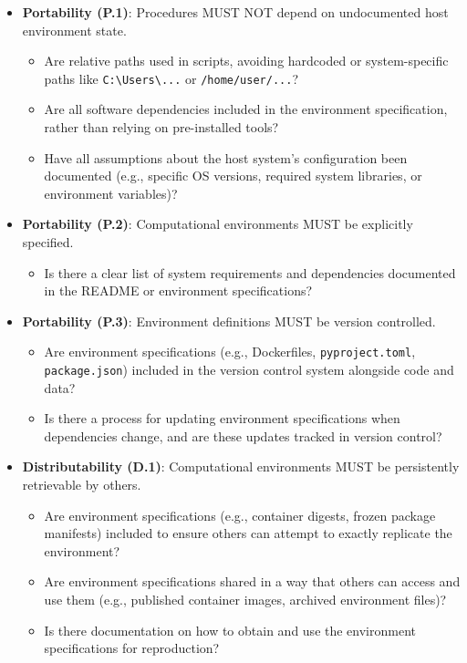 \documentclass{article}
\begin{document}
\begin{itemize}[label=$\triangleright$]
    \item \textbf{Portability (P.1)}: Procedures MUST NOT depend on undocumented host environment state.
    \begin{itemize}[label=$\square$]
        \item Are relative paths used in scripts, avoiding hardcoded or system-specific paths like \texttt{C:\textbackslash Users\textbackslash ...} or \texttt{/home/user/...}?
        \item Are all software dependencies included in the environment specification, rather than relying on pre-installed tools?
        \item Have all assumptions about the host system's configuration been documented (e.g., specific OS versions, required system libraries, or environment variables)?
    \end{itemize}
    \item \textbf{Portability (P.2)}: Computational environments MUST be explicitly specified.
    \begin{itemize}[label=$\square$]
        \item Is there a clear list of system requirements and dependencies documented in the README or environment specifications?
    \end{itemize}
    \item \textbf{Portability (P.3)}: Environment definitions MUST be version controlled.
    \begin{itemize}[label=$\square$]
        \item Are environment specifications (e.g., Dockerfiles, \texttt{pyproject.toml}, \texttt{package.json}) included in the version control system alongside code and data?
        \item Is there a process for updating environment specifications when dependencies change, and are these updates tracked in version control?
    \end{itemize}
    \item \textbf{Distributability (D.1)}: Computational environments MUST be persistently retrievable by others.
    \begin{itemize}[label=$\square$]
        \item Are environment specifications (e.g., container digests, frozen package manifests) included to ensure others can attempt to exactly replicate the environment?
        \item Are environment specifications shared in a way that others can access and use them (e.g., published container images, archived environment files)?
        \item Is there documentation on how to obtain and use the environment specifications for reproduction?
    \end{itemize}
\end{itemize}
\end{document}
